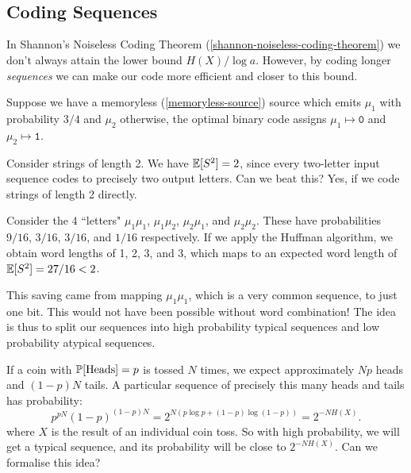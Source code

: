 \documentclass{article}
\begin{document}
\

\


\subsection{Coding Sequences}

In Shannon's Noiseless Coding Theorem (\ref{shannon-noiseless-coding-theorem}) we don't always attain the lower bound $H(X) / \log a$. However, by coding longer \textit{sequences} we can make our code more efficient and closer to this bound.

\begin{example}
    Suppose we have a memoryless (\ref{memoryless-source}) source which emits $\mu_1$ with probability $3/4$ and $\mu_2$ otherwise, the optimal binary code assigns $\mu_1 \mapsto \texttt{0}$ and $\mu_2 \mapsto \texttt{1}$.
    
    Consider strings of length 2. We have $\E[S^2] = 2$, since every two-letter input sequence codes to precisely two output letters. Can we beat this? Yes, if we code strings of length 2 directly.
    
    Consider the 4 ``letters" $\mu_1\mu_1$, $\mu_1\mu_2$, $\mu_2\mu_1$, and $\mu_2\mu_2$. These have probabilities $9/16$, $3/16$, $3/16$, and $1/16$ respectively. If we apply the Huffman algorithm, we obtain word lengths of 1, 2, 3, and 3, which maps to an expected word length of $\E[S^2] = 27/16 < 2$.
    
    This saving came from mapping $\mu_1 \mu_1$, which is a very common sequence, to just one bit. This would not have been possible without word combination! The idea is thus to split our sequences into high probability typical sequences and low probability atypical sequences.
\end{example}

If a coin with $\P[\text{Heads}] = p$ is tossed $N$ times, we expect approximately $Np$ heads and $(1-p)N$ tails. A particular sequence of precisely this many heads and tails has probability:
\[
p^{pN} (1-p)^{(1-p)N} = 2^{N(p \log p + (1-p)\log(1-p))} = 2^{-NH(X)}.
\]
where $X$ is the result of an individual coin toss. So with high probability, we will get a typical sequence, and its probability will be close to $2^{-NH(X)}$. Can we formalise this idea?
\end{document}
